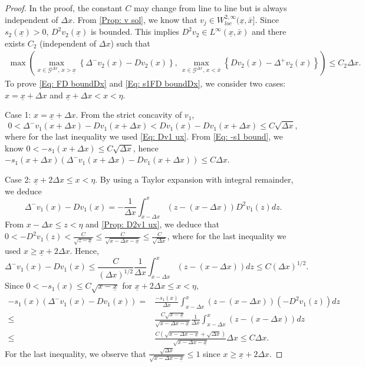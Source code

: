\documentclass[10pt,a4paper]{amsart}
\newcommand{\D}{\Delta}
\newcommand{\Dx}{{\Delta x}}
\newcommand{\g}{\gamma}
\newcommand{\lc}{\left(}
\newcommand{\p}{\psi}
\newcommand{\rc}{\right)}
\newcommand{\ux}{{\underline x}}
\begin{document}
\begin{proof}
In the proof, the constant $C$ may change from line to line but is always independent of $\D x$. From \cref{Prop: v sol}, we know that $v_j\in W^{2,\infty}_{loc}(\ux,\bar{x}]$. Since $s_2(\ux)>0$,  $D^2 v_2(\ux)$ is bounded. This implies $D^2 v_2\in L^\infty(\ux,\bar{x})$ and there exists $C_2$ (independent of $\D x$) such that 
$$
\begin{aligned}
\max\lc\max_{x\in \mathcal{G}^{\D x},\,x>\ux}\left\{\D^-{v_{2}(x)}-Dv_{2}(x)\right\},\,\max_{x\in \mathcal{G}^{\D x},\,x<\bar{x}}\left\{Dv_{2}(x)-\D^+{v_{2}(x)}\right\}\rc\leq C_2\Dx.
\end{aligned}
$$
To prove \cref{Eq: FD boundDx} and \cref{Eq: s1FD boundDx}, we consider two cases: $x=\ux+\D x$ and $\ux+\D x<x<\eta$.\par
Case 1:  $x=\ux+\D x$. From the strict concavity of $v_1$, 
$$
0<\D^-{v_{1}(x+\D x)}-Dv_{1}(x+\D x)<Dv_{1}(x)-Dv_{1}(x+\D x)\leq C\sqrt{\D x},
$$ 
where for the last inequality we used \cref{Eq: Dv1 ux}. From \cref{Eq: -s1 bound}, we know $0<-s_1(x+\D x)\leq C\sqrt{\D x}$, hence
$
-s_1(x+\D x)\lc\D^-{v_{1}(x+\D x)}-Dv_{1}(x+\D x)\rc \leq C\D x.
$\par
 Case 2: $\ux+2\D x\leq x< \eta$. By using a Taylor expansion with integral remainder, we deduce
$$
\D^-{v_{1}(x)}-Dv_{1}(x)=-\frac{1}{\D x}\int_{x-\D x}^{x}(z-(x-\D x))D^2v_1(z)dz.
$$
From $x-\D x\leq z<\eta$ and \cref{Prop: D2v1 ux}, we deduce that $0<-D^2v_1(z)<\frac{C}{\sqrt{z-\ux}}\leq \frac{C}{\sqrt{x-\D x-\ux}}\leq \frac{C}{\sqrt{\D x}}$, where for the last inequality we used $x\geq \ux+2\D x$. Hence,  
$$
\D^-{v_{1}(x)}-Dv_{1}(x)\leq \frac{C}{(\D x)^{1/2}}\frac{1}{\D x}\int_{x-\D x}^{x}(z-(x-\D x))dz\leq C(\D x)^{1/2}.
$$
Since $0<-s_1(x)\leq C\sqrt{x-\ux}$ for $\ux+2\D x\leq x< \eta$, 
$$
\begin{aligned}
-s_1(x)\lc\D^-{v_{1}(x)}-Dv_{1}(x)\rc={}&\frac{-s_1(x)}{\D x}\int_{x-\D x}^{x}(z-(x-\D x))\lc-D^2v_1(z)\rc dz\\
\leq {}&\frac{C\sqrt{x-\ux}}{\sqrt{x-\D x-\ux}}\frac{1}{\D x}\int_{x-\D x}^{x}(z-(x-\D x))dz\\
\leq {}&\frac{C(\sqrt{x-\D x-\ux}+\sqrt{\D x})}{\sqrt{x-\D x-\ux}}\D x\leq C\D x.
\end{aligned}
$$
For the last inequality, we observe that $\frac{\sqrt{\D x}}{\sqrt{x-\D x-\ux}}\leq 1$ since $x\geq \ux+2\D x$. 

\end{proof}
\end{document}
